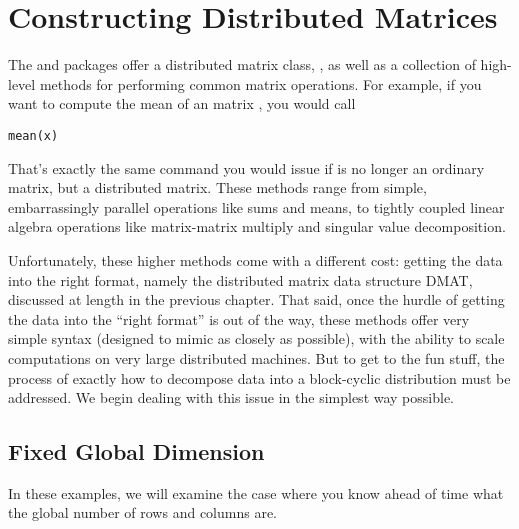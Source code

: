 
\chapter{Constructing Distributed Matrices}
\label{chap:makedmat}

\vspace{0.5cm}


The  and  packages offer a distributed matrix class,
,
as well as a collection of high-level methods for performing common matrix 
operations.  For example, if you want to compute the mean of an  
matrix , you would call 
\begin{lstlisting}[language=rr]
mean(x)
\end{lstlisting}
That's exactly the same command you would issue if  is no longer an 
ordinary  matrix, but a distributed matrix.  These methods range 
from simple, embarrassingly parallel operations like sums and means, to tightly 
coupled linear algebra operations like matrix-matrix multiply and singular value 
decomposition.

Unfortunately, these higher methods come with a different cost:  getting the 
data into the right format, namely the distributed matrix data structure DMAT, 
discussed at length in the previous chapter.  That said, once the hurdle of 
getting the data into the ``right format'' is out of the way, these methods 
offer very simple syntax (designed to mimic  as closely as 
possible), with the ability to scale computations on very large distributed 
machines.  But to get to the fun stuff, the process of exactly how to decompose 
data into a block-cyclic distribution must be addressed.  We begin dealing with 
this issue in the simplest way possible.  




\section{Fixed Global Dimension}

In these examples, we will examine the case where you know ahead of time what 
the global number of rows and columns are.

